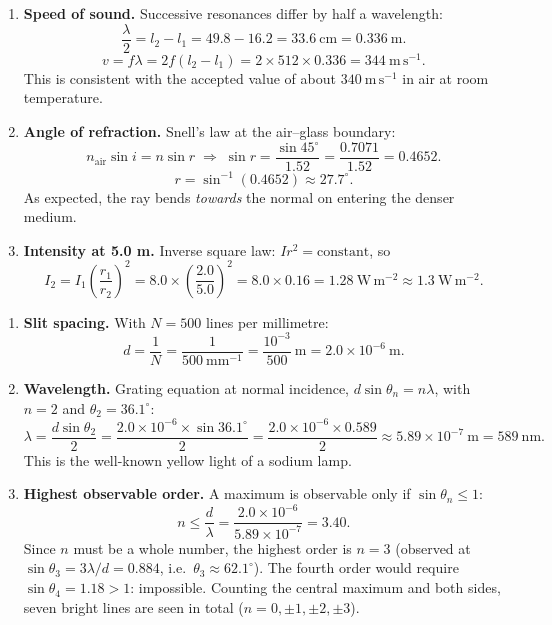 \documentclass[11pt]{article}
\begin{document}
\begin{corrige}
\begin{enumerate}
\item \textbf{Speed of sound.} Successive resonances differ by half a wavelength:
\[ \frac{\lambda}{2} = l_{2}-l_{1} = 49.8 - 16.2 = 33.6\ \mathrm{cm} = 0.336\ \mathrm{m}. \]
\[ v = f\lambda = 2f(l_{2}-l_{1}) = 2\times 512 \times 0.336 = 344\ \mathrm{m\,s^{-1}}. \]
This is consistent with the accepted value of about $340\ \mathrm{m\,s^{-1}}$ in air at room temperature.

\item \textbf{Angle of refraction.} Snell's law at the air--glass boundary:
\[ n_{\text{air}}\sin i = n\sin r \;\Rightarrow\; \sin r = \frac{\sin 45^{\circ}}{1.52} = \frac{0.7071}{1.52} = 0.4652. \]
\[ r = \sin^{-1}(0.4652) \approx 27.7^{\circ}. \]
As expected, the ray bends \emph{towards} the normal on entering the denser medium.

\item \textbf{Intensity at 5.0 m.} Inverse square law: $I r^{2} = \text{constant}$, so
\[ I_{2} = I_{1}\left(\frac{r_{1}}{r_{2}}\right)^{2} = 8.0\times\left(\frac{2.0}{5.0}\right)^{2} = 8.0\times 0.16 = 1.28\ \mathrm{W\,m^{-2}} \approx 1.3\ \mathrm{W\,m^{-2}}. \]
\end{enumerate}
\end{corrige}

\begin{corrige}
\begin{enumerate}
\item \textbf{Slit spacing.} With $N = 500$ lines per millimetre:
\[ d = \frac{1}{N} = \frac{1}{500\ \mathrm{mm^{-1}}} = \frac{10^{-3}}{500}\ \mathrm{m} = 2.0\times10^{-6}\ \mathrm{m}. \]

\item \textbf{Wavelength.} Grating equation at normal incidence, $d\sin\theta_{n} = n\lambda$, with $n = 2$ and $\theta_{2} = 36.1^{\circ}$:
\[ \lambda = \frac{d\sin\theta_{2}}{2} = \frac{2.0\times10^{-6}\times\sin 36.1^{\circ}}{2} = \frac{2.0\times10^{-6}\times 0.589}{2} \approx 5.89\times10^{-7}\ \mathrm{m} = 589\ \mathrm{nm}. \]
This is the well-known yellow light of a sodium lamp.

\item \textbf{Highest observable order.} A maximum is observable only if $\sin\theta_{n}\leq 1$:
\[ n \leq \frac{d}{\lambda} = \frac{2.0\times10^{-6}}{5.89\times10^{-7}} = 3.40. \]
Since $n$ must be a whole number, the highest order is $n = 3$ (observed at $\sin\theta_{3} = 3\lambda/d = 0.884$, i.e.\ $\theta_{3}\approx 62.1^{\circ}$). The fourth order would require $\sin\theta_{4} = 1.18 > 1$: impossible. Counting the central maximum and both sides, seven bright lines are seen in total ($n = 0, \pm1, \pm2, \pm3$).
\end{enumerate}
\end{corrige}
\end{document}
